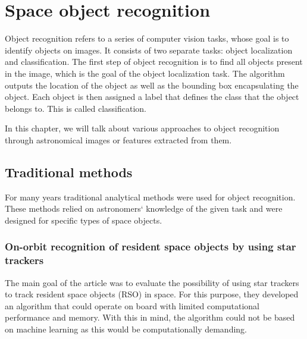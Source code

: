 \section{Space object recognition} \label{sec:spacerecognition}
Object recognition refers to a series of computer vision tasks, whose goal is to identify objects on images. It consists of two separate tasks: object localization and classification. 
The first step of object recognition is to find all objects present in the image, which is the goal of the object localization task. The algorithm outputs the location of the object as well as the bounding box encapsulating the object. Each object is then assigned a label that defines the class that the object belongs to. This is called classification. 


In this chapter, we will talk about various approaches to object recognition through astronomical images or features extracted from them. %

\subsection{Traditional methods}
For many years traditional analytical methods were used for object recognition. These methods relied on astronomers‘ knowledge of the given task and were designed for specific types of space objects. 

\subsubsection{On-orbit recognition of resident space objects by using star trackers}
The main goal of the article \cite{SPILLER2020478} was to evaluate the possibility of using star trackers to track resident space objects (RSO) in space. For this purpose, they developed an algorithm that could operate on board with limited computational performance and memory.
With this in mind, the algorithm could not be based on machine learning as this would be computationally demanding. 

